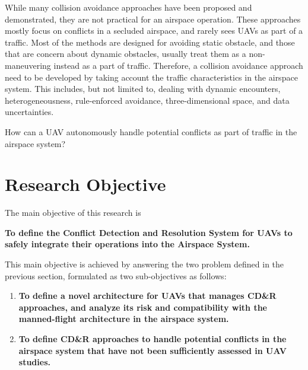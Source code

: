 While many collision avoidance approaches have been proposed and demonstrated, they are not practical for an airspace operation. These approaches mostly focus on conflicts in a secluded airspace, and rarely sees UAVs as part of a traffic. Most of the methods are designed for avoiding static obstacle, and those that are concern about dynamic obstacles, usually treat them as a non-maneuvering instead as a part of traffic. Therefore, a collision avoidance approach need to be developed by taking account the traffic characteristics in the airspace system. This includes, but not limited to, dealing with dynamic encounters, heterogeneousness, rule-enforced avoidance, three-dimensional space, and data uncertainties. 
\begin{tcolorbox}[colback=blue!5,colframe=blue!70!black,sharp corners=all,enlarge left by=5mm,width=120mm,title=\textbf{Problem 2}]
How can a UAV autonomously handle potential conflicts as part of traffic in the airspace system? %
\end{tcolorbox}
%

\section{Research Objective}
The main objective of this research is 
\begin{tcolorbox}[colback=blue!5,colframe=blue!70!black,sharp corners=all,enlarge left by=5mm,width=120mm]
\textbf{To define the Conflict Detection and Resolution System for UAVs to safely integrate their operations into the Airspace System.} 
\end{tcolorbox}

This main objective is achieved by answering the two problem defined in the previous section, formulated as two sub-objectives as follows:

\begin{enumerate}
\item \textbf{To define a novel architecture for UAVs that manages CD\&R approaches, and analyze its risk and compatibility with the manned-flight architecture in the airspace system.}
\item \textbf{To define CD\&R approaches to handle potential conflicts in the airspace system that have not been sufficiently assessed in UAV studies.}
\end{enumerate}

